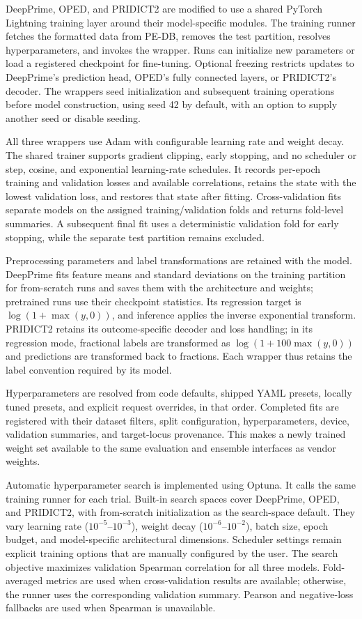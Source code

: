 \documentclass{article}
\begin{document}
DeepPrime, OPED, and PRIDICT2 are modified to use a shared PyTorch Lightning training layer around their model-specific modules. The training runner fetches the formatted data from PE-DB, removes the test partition, resolves hyperparameters, and invokes the wrapper. Runs can initialize new parameters or load a registered checkpoint for fine-tuning. Optional freezing restricts updates to DeepPrime's prediction head, OPED's fully connected layers, or PRIDICT2's decoder. The wrappers seed initialization and subsequent training operations before model construction, using seed 42 by default, with an option to supply another seed or disable seeding.

All three wrappers use Adam with configurable learning rate and weight decay. The shared trainer supports gradient clipping, early stopping, and no scheduler or step, cosine, and exponential learning-rate schedules. It records per-epoch training and validation losses and available correlations, retains the state with the lowest validation loss, and restores that state after fitting. Cross-validation fits separate models on the assigned training/validation folds and returns fold-level summaries. A subsequent final fit uses a deterministic validation fold for early stopping, while the separate test partition remains excluded.

Preprocessing parameters and label transformations are retained with the model. DeepPrime fits feature means and standard deviations on the training partition for from-scratch runs and saves them with the architecture and weights; pretrained runs use their checkpoint statistics. Its regression target is $\log(1+\max(y,0))$, and inference applies the inverse exponential transform. PRIDICT2 retains its outcome-specific decoder and loss handling; in its regression mode, fractional labels are transformed as $\log(1+100\max(y,0))$ and predictions are transformed back to fractions. Each wrapper thus retains the label convention required by its model.

Hyperparameters are resolved from code defaults, shipped YAML presets, locally tuned presets, and explicit request overrides, in that order. Completed fits are registered with their dataset filters, split configuration, hyperparameters, device, validation summaries, and target-locus provenance. This makes a newly trained weight set available to the same evaluation and ensemble interfaces as vendor weights.

Automatic hyperparameter search is implemented using Optuna. It calls the same training runner for each trial. Built-in search spaces cover DeepPrime, OPED, and PRIDICT2, with from-scratch initialization as the search-space default. They vary learning rate ($10^{-5}$--$10^{-3}$), weight decay ($10^{-6}$--$10^{-2}$), batch size, epoch budget, and model-specific architectural dimensions. Scheduler settings remain explicit training options that are manually configured by the user.
The search objective maximizes validation Spearman correlation for all three models. Fold-averaged metrics are used when cross-validation results are available; otherwise, the runner uses the corresponding validation summary. Pearson and negative-loss fallbacks are used when Spearman is unavailable.
\end{document}
